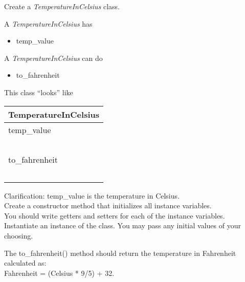 	\item Create a \textit{TemperatureInCelsius} class.\\
	\begin{minipage}{.6\textwidth}		
		A \textit{TemperatureInCelsius} has
		\begin{itemize}
			\item temp\_value
		\end{itemize}

		A \textit{TemperatureInCelsius} can do
		\begin{itemize}
			\item to\_fahrenheit
		\end{itemize}
	\end{minipage}
	\begin{minipage}{.4\textwidth}
		This class ``looks'' like 
				
		\vspace*{1em}
		\begin{tabular}{|l|}
			\hline TemperatureInCelsius\\ \hline
			temp\_value\\ \ \\  \hline
			to\_fahrenheit\\ \ \\ \hline
		\end{tabular}
	\end{minipage}



	\vspace*{2ex}
	Clarification: temp\_value is the temperature in Celsius.\\
	Create a constructor method that initializes all instance variables.\\
	You should write getters and setters for each of the instance variables.\\
	Instantiate an instance of the class. You may pass any initial values of your choosing.
	
	The to\_fahrenheit() method should return the temperature in Fahrenheit calculated as:\\
	Fahrenheit = (Celsius * 9/5) + 32.\




